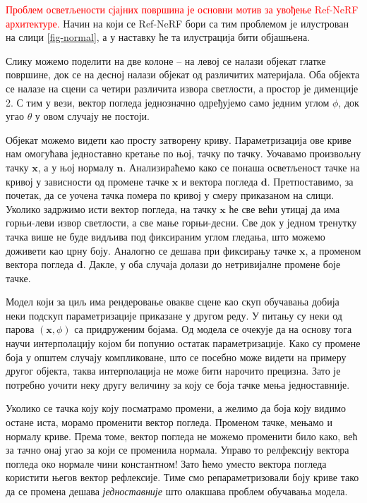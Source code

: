 \documentclass[12pt, a4paper, twoside]{book}
\numberwithin{equation}{chapter}
\numberwithin{theorem}{section}
\numberwithin{definition}{section}
\numberwithin{definitionChapter}{chapter}
\begin{document}
\textcolor{red}{Проблем осветљености сјајних површина је основни мотив за увођење Ref-NeRF архитектуре.}
Начин на који се Ref-NeRF бори са тим проблемом је илустрован на слици \ref{fig-normal}, а у наставку ће та
илустрација бити објашњена.

Слику можемо поделити на две колоне -- на левој се налази објекат глатке површине, док се на десној
налази објекат од различитих материјала. Оба објекта се налазе на сцени са четири различита извора светлости,
а простор је дименције 2. С тим у вези, вектор погледа једнозначно одређујемо само једним углом $\phi$, док
угао $\theta$ у овом случају не постоји.

Објекат можемо видети као просту затворену криву. Параметризација ове криве нам омогућава једноставно
кретање по њој, тачку по тачку. Уочавамо произвољну тачку $\mathbf{x}$, а у њој нормалу $\mathbf{n}$.
Анализираћемо како се понаша осветљеност тачке на кривој у зависности од промене тачке $\mathbf{x}$ и 
вектора погледа $\mathbf{d}$. Претпоставимо, за почетак, да се уочена тачка помера по кривој у смеру приказаном
на слици. Уколико задржимо исти вектор погледа, на тачку $\mathbf{x}$ ће све већи утицај да има горњи-леви
извор светлости, а све мање горњи-десни. Све док у једном тренутку тачка више не буде видљива под фиксираним
углом гледања, што можемо доживети као црну боју. Аналогно се дешава при фиксирању тачке $\mathbf{x}$, а
променом вектора погледа $\mathbf{d}$. Дакле, у оба случаја долази до нетривијалне промене боје тачке.

Модел који за циљ има рендеровање овакве сцене као скуп обучавања добија неки подскуп параметризације
приказане у другом реду. У питању су неки од парова $(\mathbf{x}, \phi)$ са придруженим бојама. Од модела
се очекује да на основу тога научи интерполацију којом би попунио остатак параметризације. Како су промене
боја у општем случају компликоване, што се посебно може видети на примеру другог објекта, таква интерполација
не може бити нарочито прецизна. Зато је потребно уочити неку другу величину за коју се боја тачке мења
једноставније.

Уколико се тачка коју коју посматрамо промени, а желимо да боја коју видимо остане иста, морамо променити вектор
погледа. Променом тачке, мењамо и нормалу криве. Према томе, вектор погледа не можемо променити било како, већ за
тачно онај угао за који се променила нормала. Управо то релфексију вектора погледа око нормале чини
константном! Зато ћемо уместо вектора погледа користити његов вектор рефлексије. Тиме смо репараметризовали
боју криве тако да се промена дешава \textit{једноставније} што олакшава проблем обучавања модела.
\end{document}
